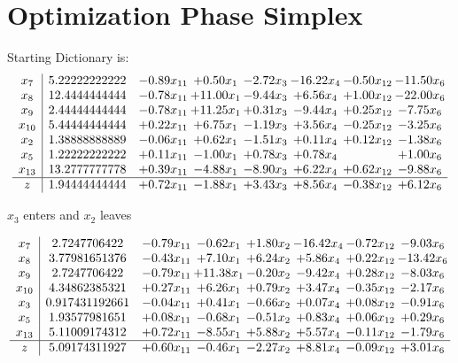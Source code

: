 \documentclass[9pt]{article}
\begin{document}
\section{Optimization Phase Simplex}
Starting Dictionary is:
\[\begin{array}{c| c c@{\hskip 2pt} c@{\hskip 2pt} c@{\hskip 2pt} c@{\hskip 2pt} c@{\hskip 2pt} c@{\hskip 2pt} }
 x_{7}   &  5.22222222222 & -0.89 x_{11} & +  0.50 x_{1} & -2.72 x_{3} & -16.22 x_{4} & -0.50 x_{12} & -11.50 x_{6}\\
 x_{8}   &  12.4444444444 & -0.78 x_{11} & + 11.00 x_{1} & -9.44 x_{3} & +  6.56 x_{4} & +  1.00 x_{12} & -22.00 x_{6}\\
 x_{9}   &  2.44444444444 & -0.78 x_{11} & + 11.25 x_{1} & +  0.31 x_{3} & -9.44 x_{4} & +  0.25 x_{12} & -7.75 x_{6}\\
 x_{10}   &  5.44444444444 & +  0.22 x_{11} & +  6.75 x_{1} & -1.19 x_{3} & +  3.56 x_{4} & -0.25 x_{12} & -3.25 x_{6}\\
 x_{2}   &  1.38888888889 & -0.06 x_{11} & +  0.62 x_{1} & -1.51 x_{3} & +  0.11 x_{4} & +  0.12 x_{12} & -1.38 x_{6}\\
 x_{5}   &  1.22222222222 & +  0.11 x_{11} & -1.00 x_{1} & +  0.78 x_{3} & +  0.78 x_{4} &   & +  1.00 x_{6}\\
 x_{13}   &  13.2777777778 & +  0.39 x_{11} & -4.88 x_{1} & -8.90 x_{3} & +  6.22 x_{4} & +  0.62 x_{12} & -9.88 x_{6}\\
\hline
z    &  1.94444444444 & +  0.72 x_{11} & -1.88 x_{1} & +  3.43 x_{3} & +  8.56 x_{4} & -0.38 x_{12} & +  6.12 x_{6}\\
\end{array}\]


 $ x_{3} $ enters and $ x_{2} $ leaves 

 \[\begin{array}{c| c c@{\hskip 2pt} c@{\hskip 2pt} c@{\hskip 2pt} c@{\hskip 2pt} c@{\hskip 2pt} c@{\hskip 2pt} }
 x_{7}   &  2.7247706422 & -0.79 x_{11} & -0.62 x_{1} & +  1.80 x_{2} & -16.42 x_{4} & -0.72 x_{12} & -9.03 x_{6}\\
 x_{8}   &  3.77981651376 & -0.43 x_{11} & +  7.10 x_{1} & +  6.24 x_{2} & +  5.86 x_{4} & +  0.22 x_{12} & -13.42 x_{6}\\
 x_{9}   &  2.7247706422 & -0.79 x_{11} & + 11.38 x_{1} & -0.20 x_{2} & -9.42 x_{4} & +  0.28 x_{12} & -8.03 x_{6}\\
 x_{10}   &  4.34862385321 & +  0.27 x_{11} & +  6.26 x_{1} & +  0.79 x_{2} & +  3.47 x_{4} & -0.35 x_{12} & -2.17 x_{6}\\
 x_{3}   &  0.917431192661 & -0.04 x_{11} & +  0.41 x_{1} & -0.66 x_{2} & +  0.07 x_{4} & +  0.08 x_{12} & -0.91 x_{6}\\
 x_{5}   &  1.93577981651 & +  0.08 x_{11} & -0.68 x_{1} & -0.51 x_{2} & +  0.83 x_{4} & +  0.06 x_{12} & +  0.29 x_{6}\\
 x_{13}   &  5.11009174312 & +  0.72 x_{11} & -8.55 x_{1} & +  5.88 x_{2} & +  5.57 x_{4} & -0.11 x_{12} & -1.79 x_{6}\\
\hline
z    &  5.09174311927 & +  0.60 x_{11} & -0.46 x_{1} & -2.27 x_{2} & +  8.81 x_{4} & -0.09 x_{12} & +  3.01 x_{6}\\
\end{array}\]
\end{document}
